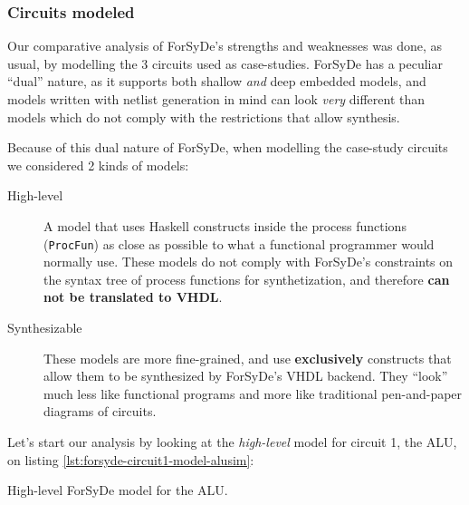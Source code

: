 \documentclass[a4paper]{article}
\begin{document}
            \subsubsection{Circuits modeled}
            \label{subsubsec:forsyde-circuits}
                Our comparative analysis of ForSyDe's strengths and weaknesses was done, as usual,
                by modelling the 3 circuits used as case-studies. ForSyDe has a peculiar ``dual''
                nature, as it supports both shallow \emph{and} deep embedded models, and models
                written with netlist generation in mind can look \emph{very} different than models
                which do not comply with the restrictions that allow synthesis.

                Because of this dual nature of ForSyDe, when modelling the case-study circuits
                we considered 2 kinds of models:

                \begin{description}
                    \item[High-level] A model that uses Haskell constructs inside the process
                        functions (\texttt{ProcFun}) as close as possible to what
                        a functional programmer would normally use. These models do not comply with
                        ForSyDe's constraints on the syntax tree of process functions for
                        synthetization, and therefore \textbf{can not be translated to VHDL}.

                    \item[Synthesizable] These models are more fine-grained, and use
                        \textbf{exclusively} constructs that allow them to be synthesized by
                        ForSyDe's VHDL backend. They ``look'' much less like functional programs and
                        more like traditional pen-and-paper diagrams of circuits.
                \end{description}

                Let's start our analysis by looking at the \emph{high-level} model for circuit 1,
                the ALU, on listing \ref{lst:forsyde-circuit1-model-alusim}:

                \begin{listing}[h!]
                    \caption{High-level ForSyDe model for the ALU.
                        \label{lst:forsyde-circuit1-model-alusim}}
                \end{listing}
\end{document}
